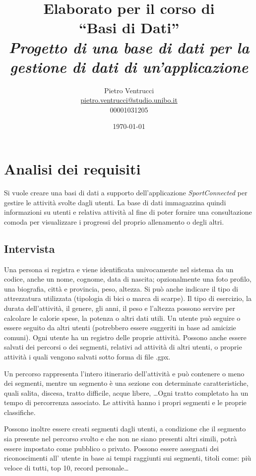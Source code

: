\documentclass[12pt]{report}
\title{Elaborato per il corso di\\``Basi di Dati''\\[0.3in]
	\large \it Progetto di una base di dati per la gestione di dati di un'applicazione
}
\author{Pietro Ventrucci\\\href{mailto:pietro.ventrucci@studio.unibo.it}{pietro.ventrucci@studio.unibo.it}\\00001031205}
\date{\today}
\begin{document}
\maketitle

\tableofcontents

\chapter{Analisi dei requisiti}

Si vuole creare una basi di dati a supporto dell'applicazione \emph{SportConnected} per gestire le attività
svolte dagli utenti. La base di dati immagazzina quindi informazioni su utenti e relativa attività al fine
di poter fornire una consultazione comoda per visualizzare i progressi del proprio allenamento o degli altri.

\section{Intervista}
Una persona si registra e viene identificata univocamente nel sistema da un codice, anche un nome, cognome, 
data di nascita; opzionalmente una foto profilo, una biografia, città e provincia, peso, altezza. 
Si può anche indicare il tipo di attrezzatura utilizzata (tipologia di bici o marca di scarpe).
Il tipo di esercizio, la durata dell'attività, il genere, gli anni, il peso e l'altezza possono servire per
calcolare le calorie spese, la potenza o altri dati utili. Un utente può seguire o essere seguito da altri 
utenti (potrebbero essere suggeriti in base ad amicizie comuni). Ogni utente ha un registro delle proprie 
attività. Possono anche essere salvati dei percorsi o dei segmenti, relativi ad attività di altri utenti, 
o proprie attività i quali vengono salvati sotto forma di file .gpx.

Un percorso rappresenta l'intero itinerario dell'attività e può contenere o meno dei segmenti, mentre un 
segmento è una sezione con determinate caratteristiche, quali salita, discesa, tratto difficile, 
acque libere, \dots Ogni tratto completato ha un tempo di percorrenza associato. Le attività hanno i 
propri segmenti e le proprie classifiche.

Possono inoltre essere creati segmenti dagli utenti, a condizione che 
il segmento sia presente nel percorso svolto e che non ne siano presenti altri simili, potrà essere 
impostato come pubblico o privato. Possono essere assegnati dei riconoscimenti all' utente in base ai 
tempi raggiunti sui segmenti, titoli come: più veloce di tutti, top 10, record personale\dots
\end{document}
